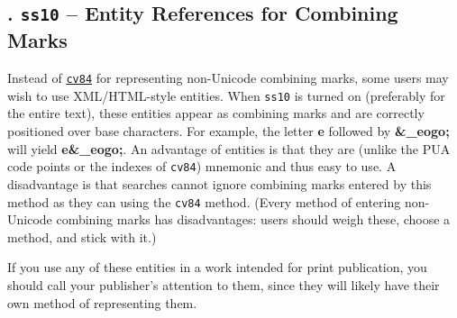 \documentclass[12pt,letterpaper,openany]{book}
\newcommand\textLetterExample[1]{\textrm{\textbf{\color{BrickRed}#1}}}
\newcommand\textSourceText[1]{{\color{GGOrange}\texttt{#1}}}
\newcounter{Feature}
\renewcommand\theFeature{\arabic{Feature}}
\begin{document}
\hypertarget{ss10}{}\subsection[44. ss10 {}-- Entity References for Combining Marks]{\stepcounter{Feature}{\theFeature}.
\textSourceText{ss10} -- Entity References for Combining Marks}
Instead of \textSourceText{\hyperlink{cv84}{cv84}} for representing non-Unicode combining marks, some users may
wish to use XML/HTML-style entities. When \textSourceText{ss10} is turned on (preferably for the entire
text), these entities appear as combining marks and are correctly positioned over base characters.
For example, the letter \textLetterExample{e} followed by
\textLetterExample{\&{\textcompwordmark}\_eogo;} will yield \textLetterExample{e\&\_eogo;}. An advantage of entities is that
they are (unlike the PUA code points or the indexes of \textSourceText{cv84}) mnemonic and thus easy to use.
A disadvantage is that
searches cannot ignore combining marks entered by this method as they can using the \textSourceText{cv84} method.
(Every method of entering non-Unicode combining marks has disadvantages: users should weigh these, choose a method,
and stick with it.)

If you use any of these entities in a work intended for print publication, you should call your publisher’s
attention to them, since they will likely have their own method of representing them.
\end{document}
